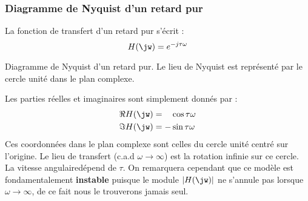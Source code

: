 \subsubsection{Diagramme de Nyquist d'un retard pur}
La fonction de transfert d'un retard pur s'écrit :
\[
H(\jw)=e^{-j\tau\omega}
\]
\begin{marginfigure}
    \centering
    \resizebox{\linewidth}{!}{}
    \caption{Diagramme de Nyquist d'un retard pur. Le lieu de Nyquist 
             est représenté par le cercle unité dans le plan complexe.
             \label{fig-nyquist_4}}
\end{marginfigure}
Les parties réelles et imaginaires sont simplement donnés par :
\begin{align*}
    \Re{H(\jw)}&=\hphantom{-}\cos{\tau\omega}\\
    \Im{H(\jw)}&=-\sin{\tau\omega}
\end{align*}
Ces coordonnées dans le plan complexe sont celles du cercle unité 
centré sur l'origine. Le lieu de transfert (c.a.d $\omega\to\infty$) 
est la rotation infinie sur ce cercle. La \og vitesse angulaire\fg dépend 
de $\tau$.
On remarquera cependant que ce modèle est fondamentalement 
\textbf{instable} puisque le module $|H(\jw)|$ ne s'annule pas 
lorsque $\omega\to\infty$, de ce fait nous le trouverons jamais seul.

